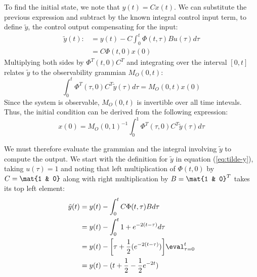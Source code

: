 \documentclass{homework}
\begin{document}
\begin{letterenum}
To find the initial state, we note that $y(t) = Cx(t)$. We can substitute the
previous expression and subtract by the known integral control input term, to
define $\tilde{y}$, the control output compensating for the input:
\begin{align}
    \tilde{y}(t) :&= y(t) - C \int_{0}^{t} \Phi(t, \tau) B u(\tau) d\tau \label{eq:tilde-y}\\
        &= C \Phi(t, 0) x(0)
\end{align}
Multiplying both sides by $\Phi^T(t, 0) C^T$ and integrating over the interval $[0, t]$ relates
$\tilde{y}$ to the observability grammian $M_O(0, t)$:
\begin{equation*}
    \int_{0}^{t} \Phi^T(\tau, 0) C^T \tilde{y}(\tau) d\tau = M_O(0, t) x(0)
\end{equation*}
Since the system is observable, $M_O(0, t)$ is invertible over all time intevals.
Thus, the initial condition can be derived from the following expression:
\begin{equation}
    x(0) = M_O(0, 1)^{-1} \int_{0}^{1}\Phi^T(\tau, 0) C^T \tilde{y}(\tau) d\tau
    \label{eq:init-cond}
\end{equation}

We must therefore evaluate the grammian and the integral involving $\tilde{y}$ to compute the
output. We start with the definition for $\tilde{y}$ in equation (\ref{eq:tilde-y}), taking
$u(\tau) = 1$ and noting that left multiplication of $\Phi(t, 0)$ by $C=\mat{1 & 0}$ along with right multiplication
by $B = \mat{1 & 0}^T$ takes its top left element:
\begin{align*}
    \tilde{y}(t) &= y(t) - \int_{0}^{t} C\Phi(t, \tau) B d\tau \\
        &= y(t) - \int_{0}^{t} 1 + e^{-2(t - \tau)} d\tau \\
        &= y(t) - \biggl[
            \tau + \frac{1}{2} (e^{-2(t-\tau)})
        \biggr]\eval_{\tau=0}^t \\
        &= y(t) - (t + \frac{1}{2} - \frac{1}{2}e^{-2t})
\end{align*}


\end{letterenum}
\end{document}
